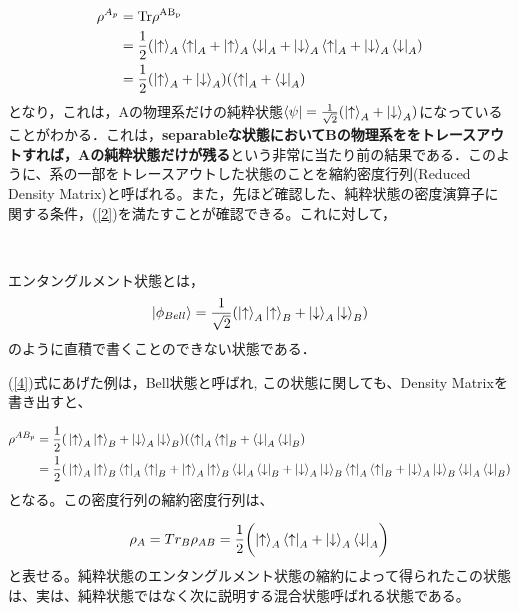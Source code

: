 \begin{align}
  \rho^{A_{p}}&=\rm{Tr}\rho^{AB_{p}} \\
  &=\frac{1}{2}(
\ket{\uparrow}_{A}\bra{\uparrow}_{A}+\ket{\uparrow}_{A}\bra{\downarrow}_{A}+\ket{\downarrow}_{A}\bra{\uparrow}_{A}+\ket{\downarrow}_{A}\bra{\downarrow}_{A})\\
&=\frac{1}{2}(\ket{\uparrow}_{A}+\ket{\downarrow}_{A})(\bra{\uparrow}_{A}+\bra{\downarrow}_{A})
\end{align}
となり，これは，Aの物理系だけの純粋状態$\bra{\psi}=\frac{1}{\sqrt{2}}(\ket{\uparrow}_{A}+\ket{\downarrow}_{A})$になっていることがわかる．これは，\textbf{separableな状態においてBの物理系ををトレースアウトすれば，Aの純粋状態だけが残る}という非常に当たり前の結果である．このように、系の一部をトレースアウトした状態のことを縮約密度行列(Reduced Density Matrix)と呼ばれる。また，先ほど確認した、純粋状態の密度演算子に関する条件，(\ref{2})を満たすことが確認できる。これに対して，
\begin{empheqboxed}
\
\

エンタングルメント状態とは，
\begin{equation}
    \label{4}
    \ket{\phi_{Bell}}=\frac{1}{\sqrt{2}}(\ket{\uparrow}_{A}\ket{\uparrow}_{B}+\ket{\downarrow}_{A}\ket{\downarrow}_{B})
    \end{equation}
    のように直積で書くことのできない状態である．
\end{empheqboxed}
(\ref{4})式にあげた例は，Bell状態と呼ばれ,
この状態に関しても、Density Matrixを書き出すと、

\begin{align}
  \rho^{AB_{p}}=\frac{1}{2}(&\ket{\uparrow}_{A}\ket{\uparrow}_{B}+\ket{\downarrow}_{A}\ket{\downarrow}_{B})
  (\bra{\uparrow}_{A}\bra{\uparrow}_{B}+\bra{\downarrow}_{A}\bra{\downarrow}_{B}) \nonumber \\
  =\frac{1}{2}(
&\ket{\uparrow}_{A}\ket{\uparrow}_{B}\bra{\uparrow}_{A}\bra{\uparrow}_{B}+\ket{\uparrow}_{A}\ket{\uparrow}_{B}\bra{\downarrow}_{A}\bra{\downarrow}_{B}+\ket{\downarrow}_{A}\ket{\downarrow}_{B}\bra{\uparrow}_{A}\bra{\uparrow}_{B}\nonumber+\ket{\downarrow}_{A}\ket{\downarrow}_{B}\bra{\downarrow}_{A}\bra{\downarrow}_{B}\nonumber)
\end{align}
となる。この密度行列の縮約密度行列は、

\begin{equation}
  \label{10}
\rho_{A}=Tr_{B}\rho_{AB}=\frac{1}{2}\biggl(\ket{\uparrow}_{A}\bra{\uparrow}_{A}+\ket{\downarrow}_{A}\bra{\downarrow}_{A}\biggr)
\end{equation}
と表せる。純粋状態のエンタングルメント状態の縮約によって得られたこの状態は、実は、純粋状態ではなく次に説明する混合状態呼ばれる状態である。


